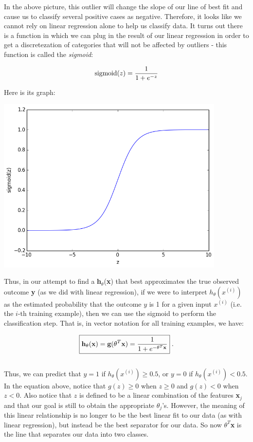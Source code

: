 \documentclass[11pt,a4paper,oneside]{report}
\begin{document}
In the above picture, this outlier will change the slope of our line of best fit and cause us to classify several positive cases as negative. Therefore, it looks like we cannot rely on linear regression alone to help us classify data. It turns out there is a function in which we can plug in the result of our linear regression in order to get a discretezation of categories that will not be affected by outliers - this function is called the \emph{sigmoid}:

\[
\textnormal{sigmoid}(z) = \frac{1}{1+e^{-z}}
\]

Here is its graph:

\begin{center}
\includegraphics[width=4.5in]{sigmoid.png}\\
\end{center}

Thus, in our attempt to find a {\bf h$_{\theta}$}({\bf x}) that best approximates the true observed outcome {\bf y} (as we did with linear regression), if we were to interpret $h_{\theta}(x^{(i)})$ as the estimated probability that the outcome $y$ is 1 for a given input $x^{(i)}$ (i.e. the $i$-th training example), then we can use the sigmoid to perform the classification step. That is, in vector notation for all training examples, we have:

\[
\boxed{\textnormal{\bf h}_{\theta}(\textnormal{\bf x}) = \textnormal{\bf g}(\theta^T\textnormal{\bf x}) = \frac{1}{1+e^{-\theta^T\textnormal{\bf x}}}}\;\textnormal{.}
\]\\

Thus, we can predict that $y = 1$ if $h_{\theta}(x^{(i)}) \geq 0.5$, or $y = 0$ if $h_{\theta}(x^{(i)}) < 0.5$. In the equation above, notice that $g(z) \geq 0$ when $z \geq 0$ and $g(z) < 0$ when $z < 0$. Also notice that $z$ is defined to be a linear combination of the features {\bf x}$_j$ and that our goal is still to obtain the appropriate $\theta_j$'s. However, the meaning of this linear relationship is no longer to be the best linear fit to our data (as with linear regression), but instead be the best separator for our data. So now {\bf $\theta^T$x} is the line that separates our data into two classes.\\
\end{document}
